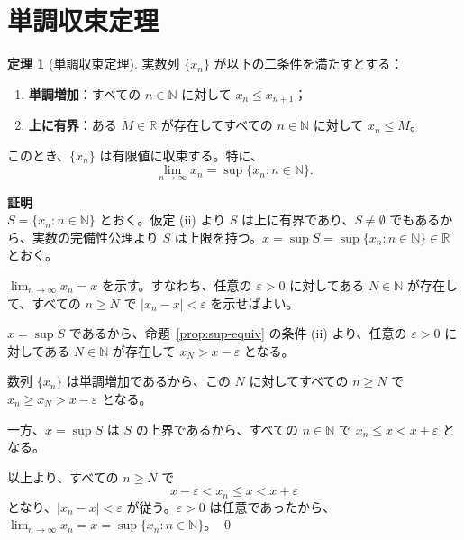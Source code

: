 \documentclass[11pt,a4paper]{jsarticle}
\theoremstyle{definition}
\newtheorem{theorem}{定理}[section]
\newcommand{\N}{\mathbb{N}}
\newcommand{\R}{\mathbb{R}}
\newcommand{\eps}{\varepsilon}
\begin{document}
\newpage

\section{単調収束定理}\label{sec:monotone}

\begin{theorembox}
\begin{theorem}[単調収束定理]\label{thm:monotone}
実数列 $\{x_n\}$ が以下の二条件を満たすとする：
\begin{enumerate}[label=(\roman*)]
\item \textbf{単調増加}：すべての $n \in \N$ に対して $x_n \leq x_{n+1}$；
\item \textbf{上に有界}：ある $M \in \R$ が存在してすべての $n \in \N$ に対して $x_n \leq M$。
\end{enumerate}
このとき、$\{x_n\}$ は有限値に収束する。特に、
\[
\lim_{n \to \infty} x_n = \sup\{x_n : n \in \N\}.
\]
\end{theorem}
\end{theorembox}

\begin{proofbox}
\textbf{証明}\ \\
\noindent
$S = \{x_n : n \in \N\}$ とおく。仮定 (ii) より $S$ は上に有界であり、$S \neq \emptyset$ でもあるから、実数の完備性公理より $S$ は上限を持つ。$x = \sup S = \sup\{x_n : n \in \N\} \in \R$ とおく。

$\lim_{n \to \infty} x_n = x$ を示す。すなわち、任意の $\eps > 0$ に対してある $N \in \N$ が存在して、すべての $n \geq N$ で $|x_n - x| < \eps$ を示せばよい。

$x = \sup S$ であるから、命題~\ref{prop:sup-equiv} の条件 (ii) より、任意の $\eps > 0$ に対してある $N \in \N$ が存在して $x_N > x - \eps$ となる。

数列 $\{x_n\}$ は単調増加であるから、この $N$ に対してすべての $n \geq N$ で $x_n \geq x_N > x - \eps$ となる。

一方、$x = \sup S$ は $S$ の上界であるから、すべての $n \in \N$ で $x_n \leq x < x + \eps$ となる。

以上より、すべての $n \geq N$ で
\[
x - \eps < x_n \leq x < x + \eps
\]
となり、$|x_n - x| < \eps$ が従う。$\eps > 0$ は任意であったから、$\lim_{n \to \infty} x_n = x = \sup\{x_n : n \in \N\}$。 \qed
\end{proofbox}
\end{document}
